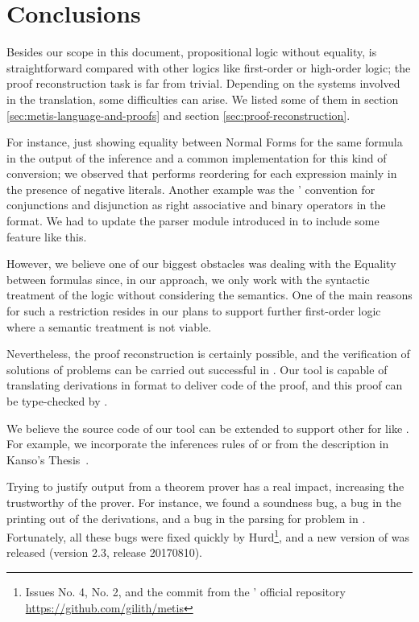 \documentclass[main.tex]{subfiles}
\begin{document}

\section{Conclusions}
\label{sec:conclusions}

Besides our scope in this document, propositional logic without
equality, is straightforward compared with other logics like
first-order or high-order logic; the proof reconstruction task is
far from trivial. Depending on the systems involved in the
translation, some difficulties can arise. We listed some of them in
section \ref{sec:metis-language-and-proofs} and section
\ref{sec:proof-reconstruction}.

For instance, just showing equality between Normal Forms for the
same formula in the output of the \canonicalize inference and a
common implementation for this kind of conversion; we observed that
\Metis performs reordering for each expression mainly in the
presence of negative literals. Another example was the \Metis'
convention for conjunctions and disjunction as right associative and
binary operators in the \TSTP format. We had to update the \TSTP
parser module introduced in \cite{Gomez-Londono2015} to include some
feature like this.

However, we believe one of our biggest obstacles was dealing with
the Equality between formulas since, in our approach, we only work
with the syntactic treatment of the logic without considering the
semantics. One of the main reasons for such a restriction resides in
our plans to support further first-order logic where a semantic
treatment is not viable.

Nevertheless, the proof reconstruction is certainly possible, and
the verification of solutions of \CPL problems can be carried out
successful in \Agda. Our tool is capable of translating \Metis
derivations in \TSTP format to deliver \Agda code of the proof, and
this proof can be type-checked by \Agda.

We believe the source code of our tool can be extended to support
other \ATPs for \CPL like . For example, we incorporate the
inferences rules of  or  from the description in
Kanso's Thesis~\cite{Kanso2012}.

Trying to justify output from a theorem prover has a real impact,
increasing the trustworthy of the prover. For instance, we found a
soundness bug, a bug in the printing out of the \TSTP derivations,
and a bug in the parsing for \TPTP problem in \Metis.
Fortunately, all these bugs were fixed quickly by Hurd\footnote{
Issues No. 4, No. 2, and the commit  from the
\Metis' official repository \url{https://github.com/gilith/metis}},
and a new version of \Metis was released
(version 2.3, release 20170810).

\end{document}
